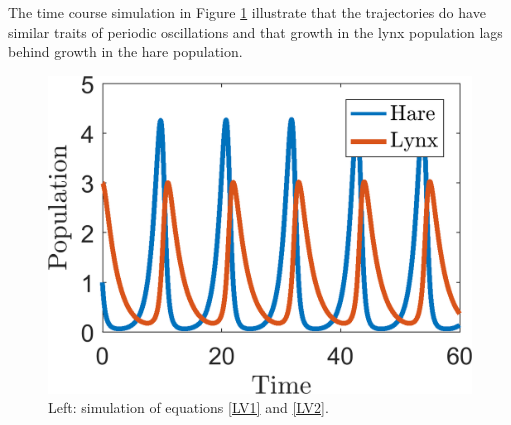 \documentclass[]{article}
\newcommand{\fig}[1]{Figure \ref{#1}}
\newcommand{\eqns}[2]{equations \eqref{#1} and \eqref{#2}}
\newcommand{\tttp}{.32\textwidth}
\begin{document}
\begin{Answ}
\subsubsection{}
The time course simulation in \fig{LV_time_sims} illustrate that the trajectories do have similar traits of periodic oscillations and that growth in the lynx population lags behind growth in the  hare population.
\begin{figure}[h!!!tb]
\centering
\includegraphics[height=\tttp]{../../Pictures/LV_time_sims.png}
\caption{Left: simulation of \eqns{LV1}{LV2}.\label{LV_time_sims}}
\end{figure}
\end{Answ}
\end{document}
